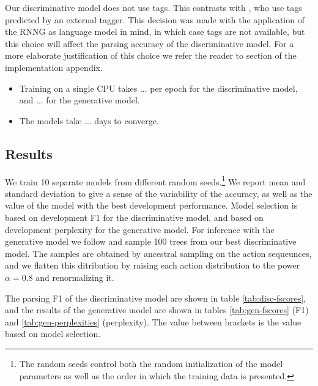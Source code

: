     Our discriminative model does not use tags. This contrasts with \citet{dyer2016rnng}, who use tags predicted by an external tagger. This decision was made with the application of the RNNG as language model in mind, in which case tags are not available, but this choice will affect the parsing accuracy of the discriminative model. For a more elaborate justification of this choice we refer the reader to section \label{sec:impl-embedding} of the implementation appendix.

    \begin{itemize}
      \item Training on a single CPU takes ... per epoch for the discriminative model, and ... for the generative model.
      \item The models take ... days to converge.
    \end{itemize}

  \subsection{Results}
    We train 10 separate models from different random seeds.\footnote{The random seeds control both the random initialization of the model parameters as well as the order in which the training data is presented.} We report mean and standard deviation to give a sense of the variability of the accuracy, as well as the value of the model with the best development performance. Model selection is based on development F1 for the discriminative model, and based on development perplexity for the generative model. For inference with the generative model we follow \citet{dyer2016rnng} and sample 100 trees from our best discriminative model. The samples are obtained by ancestral sampling on the action sequeunces, and we flatten this ditribution by raising each action distribution to the power $\alpha = 0.8$ and renormalizing it.

    The parsing F1 of the discriminative model are shown in table \ref{tab:disc-fscores}, and the results of the generative model are shown in tables \ref{tab:gen-fscores} (F1) and \ref{tab:gen-perplexities} (perplexity). The value between brackets is the value based on model selection.

    

    

    

